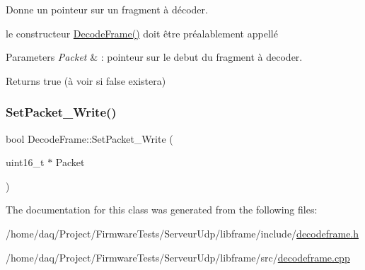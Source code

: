 Donne un pointeur sur un fragment à décoder. 

le constructeur \hyperlink{classDecodeFrame_ae6ae88ee29bcaff936e7c7b2380f96b4}{Decode\+Frame()} doit être préalablement appellé 
\begin{DoxyParams}{Parameters}
{\em Packet} & \+: pointeur sur le debut du fragment à decoder. \\
\hline
\end{DoxyParams}
\begin{DoxyReturn}{Returns}
true (à voir si false existera) 
\end{DoxyReturn}
\mbox{\label{classDecodeFrame_a82966f11399d4b9987c0718d9c2713b4}} 
\subsubsection{\texorpdfstring{Set\+Packet\+\_\+\+Write()}{SetPacket\_Write()}}
{\footnotesize\ttfamily bool Decode\+Frame\+::\+Set\+Packet\+\_\+\+Write (\begin{DoxyParamCaption}\item[{uint16\+\_\+t $\ast$}]{Packet }\end{DoxyParamCaption})}



The documentation for this class was generated from the following files\+:\begin{DoxyCompactItemize}
\item 
/home/daq/\+Project/\+Firmware\+Tests/\+Serveur\+Udp/libframe/include/\hyperlink{decodeframe_8h}{decodeframe.\+h}\item 
/home/daq/\+Project/\+Firmware\+Tests/\+Serveur\+Udp/libframe/src/\hyperlink{decodeframe_8cpp}{decodeframe.\+cpp}\end{DoxyCompactItemize}

